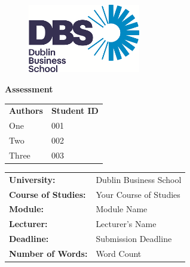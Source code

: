 \begin{titlepage}
    
    \begin{figure}[t]
        \hspace{0.9cm}
        \includegraphics[height=3cm]{images/dbs-logo.png} %
        \vspace{4cm}
    \end{figure}
    
    \begin{minipage}{\textwidth}
        \centering %
        \textbf{\LARGE{Assessment}}
    \end{minipage}
    
    \vspace{4cm} %

    \begin{tabular}[b]{l l}
        \textbf{Authors} & \textbf{Student ID} \\
        One & 001 \\
        Two & 002 \\
        Three & 003 \\
    \end{tabular}
    
    \vspace{2cm} %
    
    \begin{tabular}[b]{l l}
        \textbf{University:} & Dublin Business School \\
        \textbf{Course of Studies:} & Your Course of Studies \\
        \textbf{Module:} & Module Name \\
        \textbf{Lecturer:} & Lecturer's Name \\
        \textbf{Deadline:} & Submission Deadline \\
        \textbf{Number of Words:} & Word Count \\
    \end{tabular}
    
\end{titlepage}
